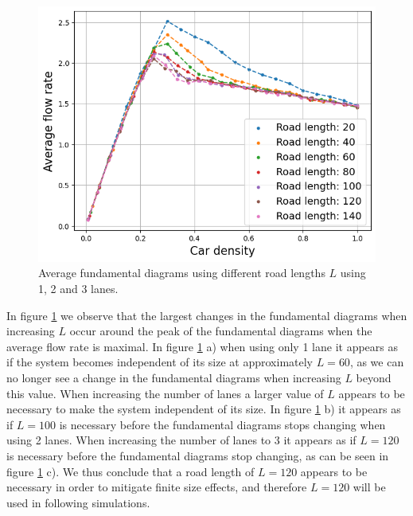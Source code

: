 \documentclass[a4paper,12pt]{article}
\begin{document}
\begin{figure}[H]
\begin{minipage}{.5\textwidth}
        \includegraphics[scale=0.47]{Images/fundamental diagrams 3 lanes 140.png}
    \end{minipage}%
    \caption{Average fundamental diagrams using different road lengths $L$ using 1, 2 and 3 lanes.}
    \label{finite size effects}
\end{figure}

In figure \ref*{finite size effects} we observe that the largest changes in the fundamental diagrams when increasing $L$ occur around the
peak of the fundamental diagrams when the average flow rate is maximal. In figure \ref*{finite size effects} a) when using only 1 lane it appears
as if the system becomes independent of its size at approximately $L=60$, as we can no longer see a change in the fundamental diagrams when increasing
$L$ beyond this value. When increasing the number of lanes a larger value of $L$ appears to be necessary to make the system independent of its size. 
In figure \ref*{finite size effects} b) it appears as if $L=100$ is necessary before the fundamental diagrams stops changing when using 2 lanes. When increasing the number
of lanes to 3 it appears as if $L=120$ is necessary before the fundamental diagrams stop changing, as can be seen in figure \ref*{finite size effects} c).
We thus conclude that a road length of $L=120$ appears to be necessary in order to mitigate finite size effects, and therefore $L=120$ will be used
in following simulations.
\end{document}
